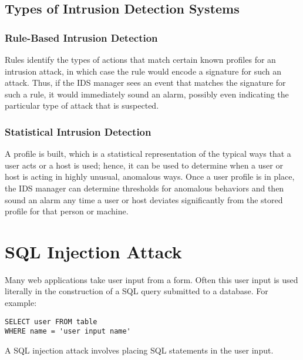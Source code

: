 \subsection{Types of Intrusion Detection Systems} 
\subsubsection{Rule-Based Intrusion Detection} 
Rules identify the types of actions that match certain known profiles for an intrusion attack, in which case the rule would encode a signature for such an attack. Thus, if the IDS manager sees an event that matches the signature for such a rule, it would immediately sound an alarm, possibly even indicating the particular type of attack that is
suspected.
\subsubsection{Statistical Intrusion Detection}
A profile is built, which is a statistical representation of the typical ways that a user acts or a host is used; hence, it can be used to determine when a user or host is acting in highly unusual, anomalous ways.
Once a user profile is in place, the IDS manager can determine thresholds for anomalous behaviors and then sound an alarm any time a user or host deviates significantly from the stored profile for that person or machine.
\section{SQL Injection Attack}
Many web applications take user input from a form. Often this user input is used literally in the construction of a SQL query submitted to a database. For example:
\begin{algorithm}
\begin{lstlisting}
SELECT user FROM table
WHERE name = 'user input name'
\end{lstlisting}
\end{algorithm}
A SQL injection attack involves placing SQL statements in the user input.

